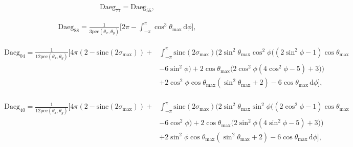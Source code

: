 \documentclass[a4paper,11pt,twoside,openright]{book}
\providecommand{\pec}{{\mathrm{pec}}}%
\providecommand{\sinc}{{\mathrm{sinc}}}%
\def\lthtmlcheckvsize{\ifdim\ht\sizebox<\vsize 
  \ifdim\wd\sizebox<\hsize\expandafter\hfill\fi \expandafter\vfill
  \else\expandafter\vss\fi}%
\begin{document}
{\newpage\clearpage
\setcounter{equation}{52}
%
\begin{subequations}\begin{flalign}
&\textrm{Daeg}_{77} = \textrm{Daeg}_{55} , &
\end{flalign}\end{subequations}%
\lthtmldisplayZ
\lthtmlcheckvsize\clearpage}

{\newpage\clearpage
\setcounter{equation}{52}
%
\begin{subequations}\begin{flalign}
&\textrm{Daeg}_{88} = \frac{1}{3\pec (\theta_x , \theta_y )} \Bigg[
2\pi -
\int_{-\pi}^{\pi}
\cos^3\theta_{\textrm{max}}
\,\mathrm{d}\phi
\Bigg] , &
\end{flalign}\end{subequations}%
\lthtmldisplayZ
\lthtmlcheckvsize\clearpage}

{\newpage\clearpage
\setcounter{equation}{52}
%
\begin{subequations}\begin{flalign}
\begin{split}
\textrm{Daeg}_{04} = \frac{1}{12\pec (\theta_x , \theta_y )} \Bigg[
4\pi \left( 2 - \sinc (2\sigma_{\textrm{max}}) \right) + &
\int_{-\pi}^{\pi}
\sinc (2\sigma_{\textrm{max}}) \bigg(2 \sin^2\theta_{\textrm{max}}\cos^2\phi \Big( \left( 2\sin^2\phi - 1 \right) \cos\theta_{\textrm{max}}\\
& - 6\sin^2\phi \Big) + 2\cos\theta_{\textrm{max}}\Big( 2\cos^2\phi \left( 4\cos^2\phi - 5 \right) + 3 \Big) \bigg) \\
& + 2\cos^2\phi \cos\theta_{\textrm{max}}\left( \sin^2\theta_{\textrm{max}}+ 2 \right) - 6\cos\theta_{\textrm{max}}
\,\mathrm{d}\phi
\Bigg] ,
\end{split} &
\end{flalign}\end{subequations}%
\lthtmldisplayZ
\lthtmlcheckvsize\clearpage}

{\newpage\clearpage
\setcounter{equation}{52}
%
\begin{subequations}\begin{flalign}
\begin{split}
\textrm{Daeg}_{40} = \frac{1}{12\pec (\theta_x , \theta_y )} \Bigg[
4\pi \left( 2 - \sinc (2\sigma_{\textrm{max}}) \right) + &
\int_{-\pi}^{\pi}
\sinc (2\sigma_{\textrm{max}}) \bigg(2 \sin^2\theta_{\textrm{max}}\sin^2\phi \Big( \left( 2\cos^2\phi - 1 \right) \cos\theta_{\textrm{max}}\\
& - 6\cos^2\phi \Big) + 2\cos\theta_{\textrm{max}}\Big( 2\sin^2\phi \left( 4\sin^2\phi - 5 \right) + 3 \Big) \bigg) \\
& + 2\sin^2\phi \cos\theta_{\textrm{max}}\left( \sin^2\theta_{\textrm{max}}+ 2 \right) - 6\cos\theta_{\textrm{max}}
\,\mathrm{d}\phi
\Bigg] ,
\end{split} &
\end{flalign}\end{subequations}%
\lthtmldisplayZ
\lthtmlcheckvsize\clearpage}
\end{document}
